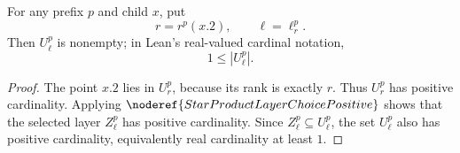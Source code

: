 \begin{lemma}
For any prefix \(p\) and child \(x\), put
\[
  r=r^p(x.2),\qquad \ell=\ell_r^p.
\]
Then \(U_\ell^p\) is nonempty; in Lean's real-valued cardinal notation,
\[
  1\le |U_\ell^p|.
\]
\end{lemma}
\begin{proof}
The point \(x.2\) lies in \(U_r^p\), because its rank is exactly \(r\).  Thus
\(U_r^p\) has positive cardinality.  Applying
\(\noderef{StarProductLayerChoicePositive}\) shows that the selected layer
\(Z_\ell^p\) has positive cardinality.  Since \(Z_\ell^p\subseteq U_\ell^p\),
the set \(U_\ell^p\) also has positive cardinality, equivalently real
cardinality at least \(1\).
\end{proof}
